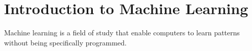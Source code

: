 \section{Introduction to Machine Learning} \label{Sec: Introduction to Machine Learning}

\cite{kaurIntroductionMachineLearning2021}

Machine learning is a field of study that enable computers to learn patterns without being specifically programmed.
